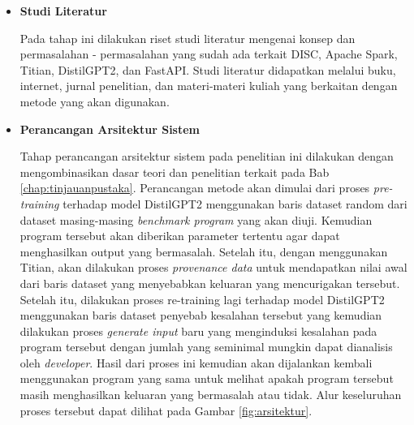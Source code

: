 \begin{itemize}[topsep=0pt]
  \item \textbf{Studi Literatur}
  
  Pada tahap ini dilakukan riset studi literatur mengenai konsep 
  dan permasalahan - permasalahan yang sudah ada terkait DISC, 
  Apache Spark, Titian, DistilGPT2, dan FastAPI. Studi literatur didapatkan melalui buku, internet, jurnal penelitian, dan materi-materi kuliah yang berkaitan dengan metode yang akan digunakan.

  \item \textbf{Perancangan Arsitektur Sistem}
  
  Tahap perancangan arsitektur sistem pada penelitian ini 
  dilakukan dengan mengombinasikan dasar teori dan penelitian 
  terkait pada Bab \ref{chap:tinjauanpustaka}. 
  Perancangan metode akan dimulai dari proses \emph{pre-training}
  terhadap model DistilGPT2 menggunakan baris dataset random dari 
  dataset masing-masing \emph{benchmark program} yang akan 
  diuji. Kemudian program tersebut akan diberikan parameter tertentu 
  agar dapat menghasilkan output yang bermasalah. Setelah itu,
  dengan menggunakan Titian, akan dilakukan proses \emph{provenance data}
  untuk mendapatkan nilai awal dari baris dataset yang menyebabkan
  keluaran yang mencurigakan tersebut. 
  Setelah itu, dilakukan proses re-training lagi terhadap
  model DistilGPT2 menggunakan baris dataset penyebab kesalahan
  tersebut yang kemudian dilakukan proses \emph{generate input}
  baru yang menginduksi kesalahan pada program tersebut dengan jumlah
  yang seminimal mungkin dapat dianalisis oleh \emph{developer}. 
  Hasil dari proses ini kemudian akan dijalankan kembali menggunakan
  program yang sama untuk melihat apakah program tersebut masih
  menghasilkan keluaran yang bermasalah atau tidak.
  Alur keseluruhan proses tersebut dapat dilihat pada 
  Gambar \ref{fig:arsitektur}.



\end{itemize}
